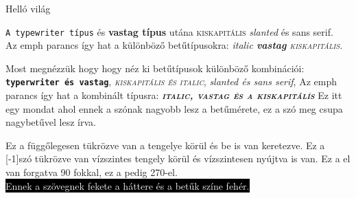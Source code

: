 \documentclass[]{article}
\begin{document}
\begin{center}
Helló világ
\end{center}
\texttt{A typewriter típus}
és
\textbf{vastag típus}
utána
\textsc{kiskapitális}
\textsl{slanted}
és
\textsf{sans serif.} \\
Az emph parancs így hat a különböző betűtípusokra:
\emph{\textit{italic} \textbf{vastag} \textsc{kiskapitális.}}

Most megnézzük hogy hogy néz ki betűtípusok különböző kombinációi:
\texttt{\textbf{typerwriter és vastag}},
\textsc{\textit{kiskapitális és italic}},
\textsl{\textsf{slanted és sans serif}},
Az emph parancs így hat a kombinált típusra:
\emph{\textit{\textbf{\textsc{italic, vastag és a kiskapitálís}}}}
{Ez itt egy mondat ahol ennek a \large szónak \normalsize nagyobb lesz a betűmérete, ez a \LARGE szó \normalsize meg csupa nagybetűvel lesz írva.}

Ez a  függőlegesen tükrözve van a tengelye körül és be is  van keretezve.
Ez a \scalebox{2.0}[-1]{szó} tükrözve van vízszintes tengely körül és vízszintesen nyújtva is van. 
Ez a  el van forgatva 90 fokkal, ez a  pedig 270-el.\\
\colorbox{black}{\textcolor{white}{Ennek a szövegnek fekete a háttere és a betűk színe fehér.}}\\
\end{document}
